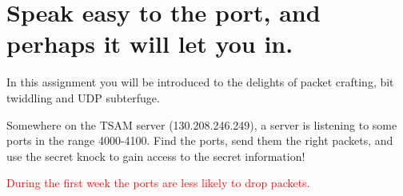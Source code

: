 \documentclass[9pt, addpoints]{exam}
\begin{document}
\section*{Speak easy to the port, and perhaps it will let you in.}
In this assignment you will be introduced to the delights of packet
crafting, bit twiddling and UDP subterfuge.

Somewhere on the TSAM server (130.208.246.249), a server is listening to some ports in the range 4000-4100. Find the ports, send them
the right packets, and use the secret knock to gain access to the secret information!

\begin{center}
    
\textcolor{red}{During the first week the ports are less likely to drop packets.}
\end{center}
\end{document}
